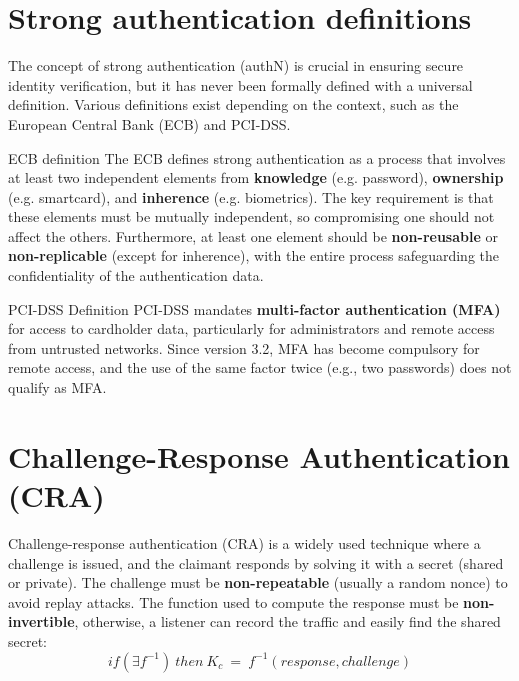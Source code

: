 \noindent{\color{gray!50}\rule{\textwidth}{0.5pt}}


\section{Strong authentication definitions}
The concept of strong authentication (authN) is crucial in ensuring secure identity verification, but it has never been formally defined with a universal definition.
Various definitions exist depending on the context, such as the European Central Bank (ECB) and PCI-DSS.

\begin{quotebox}[colframe=blue!10!white, colback=blue!5!white]{ECB definition}
    The ECB defines strong authentication as a process that involves at least two independent 
    elements from \textbf{knowledge} (e.g. password), \textbf{ownership} (e.g. smartcard), 
    and \textbf{inherence} (e.g. biometrics). The key requirement is that these elements 
    must be mutually independent, so compromising one should not affect the others. 
    Furthermore, at least one element should be \textbf{non-reusable} or \textbf{non-replicable} 
    (except for inherence), with the entire process safeguarding the confidentiality of the 
    authentication data.
\end{quotebox}

\begin{quotebox}[colframe=blue!10!white, colback=blue!5!white]{PCI-DSS Definition}
    PCI-DSS mandates \textbf{multi-factor authentication (MFA)} for access to cardholder data, 
    particularly for administrators and remote access from untrusted networks. Since version 3.2, MFA has become compulsory for remote access, 
    and the use of the same factor twice (e.g., two passwords) does not qualify as MFA.
\end{quotebox}

\section{Challenge-Response Authentication (CRA)}
Challenge-response authentication (CRA) is a widely used technique where 
a challenge is issued, and the claimant responds by solving it with a 
secret (shared or private). The challenge must be \textbf{non-repeatable} 
(usually a random nonce) to avoid replay attacks. The function used to compute 
the response must be \textbf{non-invertible}, otherwise, a listener can record the 
traffic and easily find the shared secret:
\[ if(\exists f^{-1})\ then\ K_c\ =\ f^{-1}(response, challenge)\]

